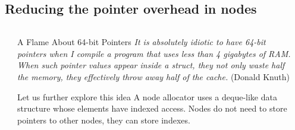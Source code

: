 \documentclass[10pt,aspectratio=169]{beamer}
\begin{document}
\subsection{Reducing the pointer overhead in nodes}

\begin{frame}[fragile]
{}

\begin{columns}
\begin{column}{0.10\textwidth}
\end{column}
\begin{column}{0.80\textwidth}
\begin{block}{A Flame About 64-bit Pointers}
{ \it \noindent
It is absolutely idiotic to have 64-bit pointers when I compile a
program that uses less than 4 gigabytes of RAM. When such pointer
values appear inside a struct, they not only waste half the memory,
they effectively throw away half of the cache.}  \hfill (Donald Knuth)
\end{block}
 {
\begin{block}{Let us further explore this idea}
\noindent
A node allocator uses a deque-like data structure whose elements
have indexed access. Nodes do not need to store pointers to other
nodes, they can store indexes.
\end{block}
}
\end{column}
\begin{column}{0.10\textwidth}
\end{column}
\end{columns}
\end{frame}
\end{document}
